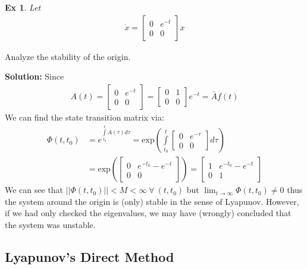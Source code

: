 \documentclass[twoside, 11pt]{article}
\newtheorem{exmp}[theorem]{Ex}
\begin{document}
\begin{exmp}
 Let 
 \begin{align*}
  \dot{x} = \begin{bmatrix} 0 & e^{-t}  \\ 0 & 0 \end{bmatrix} x
 \end{align*}
\end{exmp}
Analyze the stability of the origin.

\textbf{Solution:} Since 
\begin{align*}
  A(t) = \begin{bmatrix} 0 & e^{-t}  \\ 0 & 0 \end{bmatrix} =
  \begin{bmatrix} 0 & 1 \\ 0 & 0 \end{bmatrix} e^{-t} = \bar{A} f(t)
 \end{align*}
%
We can find the state transition matrix via:
\begin{align*}
\Phi(t,t_0) &= e^{\int\limits_{t_0}^t A(\tau) d\tau} = 
  \mathrm{exp} \left(
      \int\limits_{t_0}^t \begin{bmatrix} 0 & e^{-\tau}  \\ 0 & 0 \end{bmatrix} d\tau
  \right) \\
  &=  \mathrm{exp} \left(  \begin{bmatrix} 0 & e^{-t_0} - e^{-t}  \\ 0 & 0 \end{bmatrix} 
  \right)
  = \begin{bmatrix} 1 & e^{-t_0} - e^{-t}  \\ 0 & 1 \end{bmatrix} 
\end{align*}
%
We can see that $ || \Phi(t,t_0) || < M < \infty \ \forall \ (t,t_0)$ but $\lim_{t\to\infty} \Phi(t,t_0) \neq 0$
thus the system around the origin is (only) stable in the sense of Lyapunov. However, if we had only 
checked the eigenvalues, we may have (wrongly) concluded that the system was unstable. 

\subsection{Lyapunov's Direct Method}
\end{document}

